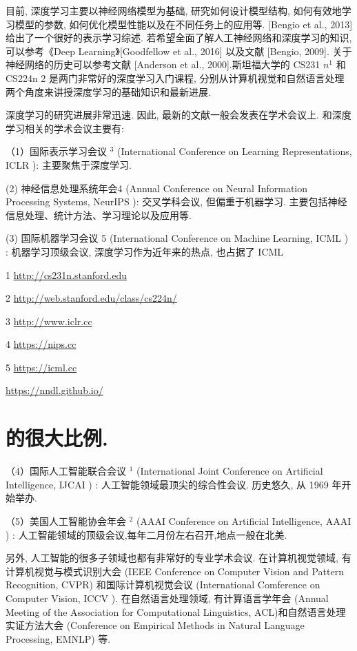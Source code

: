 \documentclass[10pt]{article}
\begin{document}
目前, 深度学习主要以神经网络模型为基础, 研究如何设计模型结构, 如何有效地学习模型的参数, 如何优化模型性能以及在不同任务上的应用等. [Bengio et al., 2013] 给出了一个很好的表示学习综述. 若希望全面了解人工神经网络和深度学习的知识, 可以参考《Deep Learning》[Goodfellow et al., 2016] 以及文献 [Bengio, 2009]. 关于神经网络的历史可以参考文献 [Anderson et al., 2000].斯坦福大学的 CS231 $n^{1}$ 和 CS224n 2 是两门非常好的深度学习入门课程, 分别从计算机视觉和自然语言处理两个角度来讲授深度学习的基础知识和最新进展.

深度学习的研究进展非常迅速. 因此, 最新的文献一般会发表在学术会议上. 和深度学习相关的学术会议主要有:

（1）国际表示学习会议 ${ }^{3}$ (International Conference on Learning Representations, ICLR ): 主要聚焦于深度学习.

(2) 神经信息处理系统年会4 (Annual Conference on Neural Information Processing Systems, NeurIPS ): 交叉学科会议, 但偏重于机器学习. 主要包括神经信息处理、统计方法、学习理论以及应用等.

(3) 国际机器学习会议 5 (International Conference on Machine Learning, ICML ) : 机器学习顶级会议, 深度学习作为近年来的热点, 也占据了 ICML

1 \href{http://cs231n.stanford.edu}{http://cs231n.stanford.edu}

2 \href{http://web.stanford.edu/class/cs224n/}{http://web.stanford.edu/class/cs224n/}

3 \href{http://www.iclr.cc}{http://www.iclr.cc}

4 \href{https://nips.cc}{https://nips.cc}

5 \href{https://icml.cc}{https://icml.cc}

\href{https://nndl.github.io/}{https://nndl.github.io/}

\section*{的很大比例.}
（4）国际人工智能联合会议 ${ }^{1}$ (International Joint Conference on Artificial Intelligence, IJCAI ) : 人工智能领域最顶尖的综合性会议. 历史悠久, 从 1969 年开始举办.

（5）美国人工智能协会年会 ${ }^{2}$ (AAAI Conference on Artificial Intelligence, AAAI ) : 人工智能领域的顶级会议,每年二月份左右召开,地点一般在北美.

另外, 人工智能的很多子领域也都有非常好的专业学术会议. 在计算机视觉领域, 有计算机视觉与模式识别大会 (IEEE Conference on Computer Vision and Pattern Recognition, CVPR) 和国际计算机视觉会议 (International Comference on Computer Vision, ICCV ). 在自然语言处理领域, 有计算语言学年会 (Annual Meeting of the Association for Computational Linguistics, ACL)和自然语言处理实证方法大会 (Conference on Empirical Methods in Natural Language Processing, EMNLP) 等.
\end{document}
